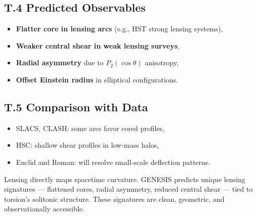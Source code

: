 \documentclass{article}
\begin{document}
\subsection*{T.4 Predicted Observables}
\begin{itemize}
  \item \textbf{Flatter core in lensing arcs} (e.g., HST strong lensing systems),
  \item \textbf{Weaker central shear in weak lensing surveys},
  \item \textbf{Radial asymmetry} due to $P_2(\cos\theta)$ anisotropy,
  \item \textbf{Offset Einstein radius} in elliptical configurations.
\end{itemize}

\subsection*{T.5 Comparison with Data}
\begin{itemize}
  \item SLACS, CLASH: some arcs favor cored profiles,
  \item HSC: shallow shear profiles in low-mass halos,
  \item Euclid and Roman: will resolve small-scale deflection patterns.
\end{itemize}

\begin{tcolorbox}[colback=gray!5, colframe=black!30, title=Why this matters]
Lensing directly maps spacetime curvature. GENESIS predicts unique lensing signatures — flattened cores, radial asymmetry, reduced central shear — tied to torsion's solitonic structure.  
These signatures are clean, geometric, and observationally accessible.
\end{tcolorbox}
\end{document}
